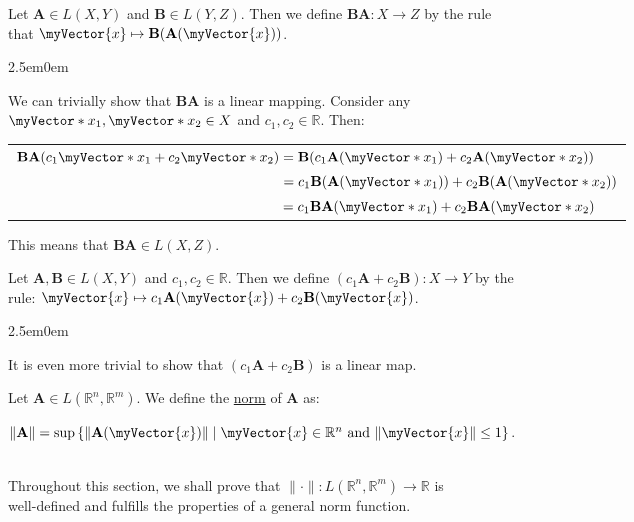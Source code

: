 \documentclass{book}
\newcommand{\exOne}{%
   \color{Purple}%
   \fontsize{14}{16}\selectfont%
}
\newenvironment{myIndent}{%
   \begin{adjustwidth}{2.5em}{0em}%
}{%
   \end{adjustwidth}%
}
\newcommand{\udefine}[1]{{%
   \setulcolor{Red}%
   \setul{0.14em}{0.07em}%
   \ul{#1}%
}}
\newcommand{\mySepTwo}[1][.]{%
   {\noindent\color{#1}{\rule{6.5in}{0.5mm}}}\\%
}
\newcommand{\retTwo}{\hfill\bigbreak}
\newcommand{\mVec}[1]{\myVector{#1}}
\newcommand{\mVecAst}[1]{\myVector*{#1}}
\newcommand{\mMat}[1]{\mathbf{#1}}
\begin{document}
Let $\mMat{A} \in L(X, Y)$ and $\mMat{B} \in L(Y, Z)$. Then we define $\mMat{BA}: X \longrightarrow Z$ by the rule\\ that $\mVec{x} \mapsto \mMat{B}(\mMat{A}(\mVec{x}))$.\retTwo

{\begin{myIndent}\exOne
   We can trivially show that $\mMat{B}\mMat{A}$ is a linear mapping. Consider any\\ $\mVecAst{x}_1, \mVecAst{x}_2 \in X$ and $c_1, c_2 \in \mathbb{R}$. Then:\\ [-6pt]
   \begin{center}
      \begin{tabular}{l}
         $\mMat{BA}(c_1\mVecAst{x}_1 + c_2\mVecAst{x}_2) = \mMat{B}(c_1\mMat{A}(\mVecAst{x}_1) + c_2\mMat{A}(\mVecAst{x}_2))$ \\ [2pt]
         $\phantom{\mMat{BA}(c_1\mVecAst{x}_1 + c_2\mVecAst{x}_2)} = c_1\mMat{B}(\mMat{A}(\mVecAst{x}_1)) + c_2\mMat{B}(\mMat{A}(\mVecAst{x}_2))$\\ [2pt]
         $\phantom{\mMat{BA}(c_1\mVecAst{x}_1 + c_2\mVecAst{x}_2)} = c_1\mMat{B}\mMat{A}(\mVecAst{x}_1) + c_2\mMat{B}\mMat{A}(\mVecAst{x}_2)$
      \end{tabular}\retTwo
   \end{center}

   This means that $\mMat{BA} \in L(X, Z)$.\retTwo
\end{myIndent}}

Let $\mMat{A}, \mMat{B} \in L(X, Y)$ and $c_1, c_2 \in \mathbb{R}$. Then we define $(c_1\mMat{A} + c_2\mMat{B}) : X \longrightarrow Y$ by the\\ rule: $\mVec{x} \mapsto c_1\mMat{A}(\mVec{x}) + c_2\mMat{B}(\mVec{x})$.\retTwo

{\begin{myIndent} \exOne
   It is even more trivial to show that $(c_1\mMat{A} + c_2\mMat{B})$ is a linear map.
\end{myIndent}}

\newpage

Let $\mMat{A} \in L(\mathbb{R}^n, \mathbb{R}^m)$. We define the \udefine{norm} of $\mMat{A}$ as: 

{\centering $\|\mMat{A}\| = \sup\left\{\|\mMat{A}(\mVec{x})\| \mid \mVec{x} \in \mathbb{R}^n \text{ and } \|\mVec{x}\| \leq 1\right\}$. \retTwo\par}

\mySepTwo

Throughout this section, we shall prove that $\|\cdot\| : L(\mathbb{R}^n, \mathbb{R}^m) \longrightarrow \mathbb{R}$ is\\ well-defined and fulfills the properties of a general norm function.\retTwo
\end{document}
